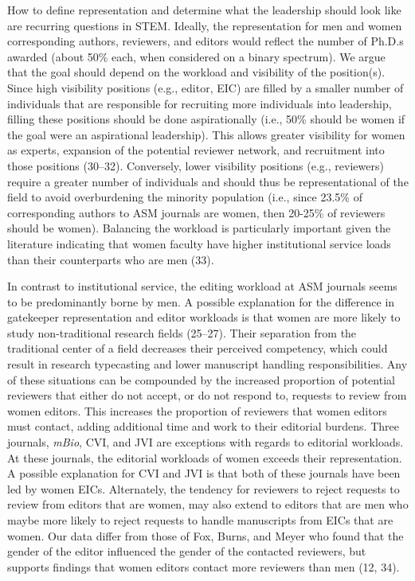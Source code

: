 \documentclass[11pt,]{article}
\begin{document}
How to define representation and determine what the leadership should
look like are recurring questions in STEM. Ideally, the representation
for men and women corresponding authors, reviewers, and editors would
reflect the number of Ph.D.s awarded (about 50\% each, when considered
on a binary spectrum). We argue that the goal should depend on the
workload and visibility of the position(s). Since high visibility
positions (e.g., editor, EIC) are filled by a smaller number of
individuals that are responsible for recruiting more individuals into
leadership, filling these positions should be done aspirationally (i.e.,
50\% should be women if the goal were an aspirational leadership). This
allows greater visibility for women as experts, expansion of the
potential reviewer network, and recruitment into those positions
(30--32). Conversely, lower visibility positions (e.g., reviewers)
require a greater number of individuals and should thus be
representational of the field to avoid overburdening the minority
population (i.e., since 23.5\% of corresponding authors to ASM journals
are women, then 20-25\% of reviewers should be women). Balancing the
workload is particularly important given the literature indicating that
women faculty have higher institutional service loads than their
counterparts who are men (33).

In contrast to institutional service, the editing workload at ASM
journals seems to be predominantly borne by men. A possible explanation
for the difference in gatekeeper representation and editor workloads is
that women are more likely to study non-traditional research fields
(25--27). Their separation from the traditional center of a field
decreases their perceived competency, which could result in research
typecasting and lower manuscript handling responsibilities. Any of these
situations can be compounded by the increased proportion of potential
reviewers that either do not accept, or do not respond to, requests to
review from women editors. This increases the proportion of reviewers
that women editors must contact, adding additional time and work to
their editorial burdens. Three journals, \emph{mBio}, CVI, and JVI are
exceptions with regards to editorial workloads. At these journals, the
editorial workloads of women exceeds their representation. A possible
explanation for CVI and JVI is that both of these journals have been led
by women EICs. Alternately, the tendency for reviewers to reject
requests to review from editors that are women, may also extend to
editors that are men who maybe more likely to reject requests to handle
manuscripts from EICs that are women. Our data differ from those of Fox,
Burns, and Meyer who found that the gender of the editor influenced the
gender of the contacted reviewers, but supports findings that women
editors contact more reviewers than men (12, 34).
\end{document}
